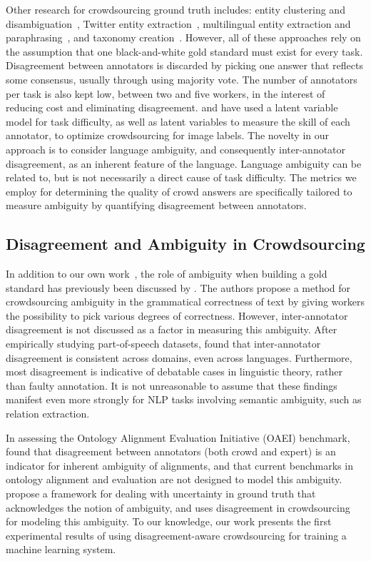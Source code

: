 Other research for crowdsourcing ground truth includes: entity clustering and disambiguation~\cite{Lee2013}, Twitter entity extraction~\cite{Finin2010}, multilingual entity extraction and paraphrasing~\cite{Chen2011}, and taxonomy creation~\cite{Chilton:2013}.  However, all of these approaches rely on the assumption that one black-and-white gold standard must exist for every task.  Disagreement between annotators is discarded by picking one answer that reflects some consensus, usually through using majority vote.  The number of annotators per task is also kept low, between two and five workers, in the interest of reducing cost and eliminating disagreement. \cite{NIPS2009_3644} and \cite{welinder2010multidimensional} have used a latent variable model for task difficulty, as well as latent variables to measure the skill of each annotator, to optimize crowdsourcing for image labels. The novelty in our approach is to consider language ambiguity, and consequently inter-annotator disagreement, as an inherent feature of the language. Language ambiguity can be related to, but is not necessarily a direct cause of task difficulty. The metrics we employ for determining the quality of crowd answers are specifically tailored to measure ambiguity by quantifying disagreement between annotators.


\subsection{Disagreement and Ambiguity in Crowdsourcing}

In addition to our own work~\cite{aroyo2013crowd}, the role of ambiguity when building a gold standard has previously been discussed by \cite{lau2014measuring}.  The authors propose a method for crowdsourcing ambiguity in the grammatical correctness of text by giving workers the possibility to pick various degrees of correctness. However, inter-annotator disagreement is not discussed as a factor in measuring this ambiguity. After empirically studying part-of-speech datasets, \cite{plank-hovy-sogaard:2014:P14-2} found that inter-annotator disagreement is consistent across domains, even across languages.  Furthermore, most disagreement is indicative of debatable cases in linguistic theory, rather than faulty annotation.  It is not unreasonable to assume that these findings manifest even more strongly for NLP tasks involving semantic ambiguity, such as relation extraction. 

In assessing the Ontology Alignment Evaluation Initiative (OAEI) benchmark, \cite{cheatham2014conference} found that disagreement between annotators (both crowd and expert) is an indicator for inherent ambiguity of alignments, and that current benchmarks in ontology alignment and evaluation are not designed to model this ambiguity. \cite{schaekermann2016} propose a framework for dealing with uncertainty in ground truth that acknowledges the notion of ambiguity, and uses disagreement in crowdsourcing for modeling this ambiguity. To our knowledge, our work presents the first experimental results of using disagreement-aware crowdsourcing for training a machine learning system.



